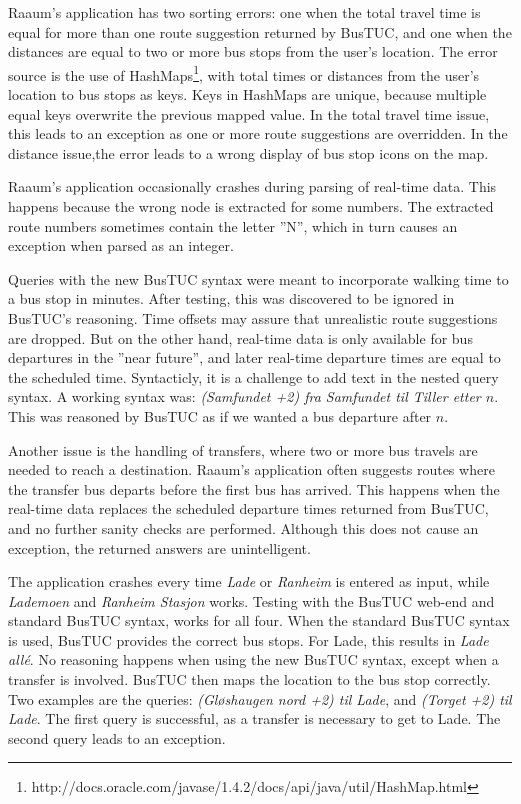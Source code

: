 Raaum's application has two sorting errors: one when the total travel time is equal for more than one route suggestion returned by BusTUC, and one when the distances are equal to two or more bus stops from the user's location. The error source is the use of HashMaps\footnote{http://docs.oracle.com/javase/1.4.2/docs/api/java/util/HashMap.html}, with total times or distances from the user's location to bus stops as keys. Keys in HashMaps are unique, because multiple equal keys overwrite the previous mapped value. In the total travel time issue, this leads to an exception as one or more route suggestions are overridden. In the distance issue,the error leads to a wrong display of bus stop icons on the map.

Raaum's application occasionally crashes during parsing of real-time data. This happens because the wrong node is extracted for some numbers. The extracted route numbers sometimes contain the letter ''N'', which in turn causes an exception when parsed as an integer. 

Queries with the new BusTUC syntax were meant to incorporate walking time to a bus stop in minutes. After testing, this was discovered to be ignored in BusTUC's reasoning. Time offsets may assure that unrealistic route suggestions are dropped. But on the other hand, real-time data is only available for bus departures in the ''near future'', and later real-time departure times are equal to the scheduled time. Syntacticly, it is a challenge to add text in the nested query syntax. A working syntax was: \emph{(Samfundet +2) fra Samfundet til Tiller etter $n$}. This was reasoned by BusTUC as if we wanted a bus departure after $n$.
 

Another issue is the handling of transfers, where two or more bus travels are needed to reach a destination. Raaum's application often suggests routes where the transfer bus departs before the first bus has arrived. This happens when the real-time data replaces the scheduled departure times returned from BusTUC, and no further sanity checks are performed. Although this does not cause an exception, the returned answers are unintelligent. 

The application crashes every time \emph{Lade} or \emph{Ranheim} is entered as input, while \emph{Lademoen} and \emph{Ranheim Stasjon} works. Testing with the BusTUC web-end and standard BusTUC syntax, works for all four. When the standard BusTUC syntax is used, BusTUC provides the correct bus stops. For Lade, this results in \emph{Lade all\'e}. No reasoning happens when using the new BusTUC syntax, except when a transfer is involved. BusTUC then maps the location to the bus stop correctly. Two examples are the queries: \emph{(Gl\o shaugen nord +2) til Lade}, and \emph{(Torget +2) til Lade}. The first query is successful, as a transfer is necessary to get to Lade. The second query leads to an  exception.

